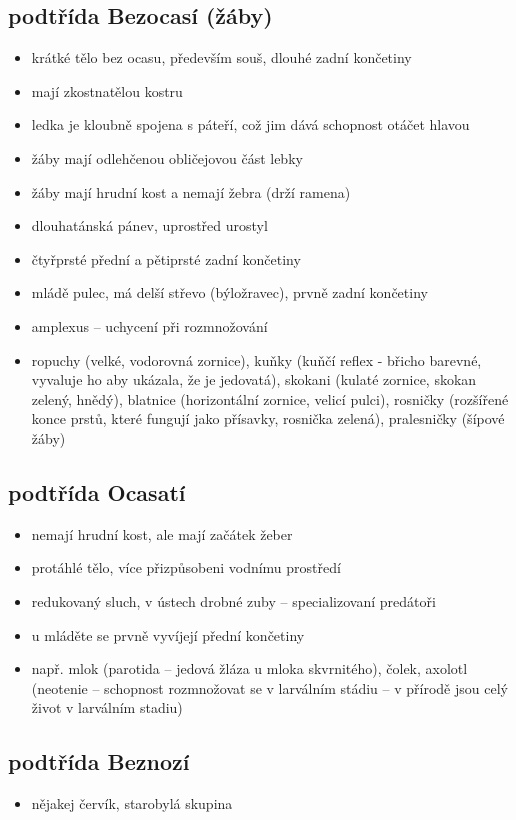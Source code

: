 \documentclass{article}
\begin{document}
\subsection{podtřída Bezocasí (žáby)}
\begin{itemize}
  \item krátké tělo bez ocasu, především souš, dlouhé zadní končetiny
  \item mají zkostnatělou kostru
  \item ledka je kloubně spojena s páteří, což jim dává schopnost otáčet hlavou
  \item žáby mají odlehčenou obličejovou část lebky
  \item žáby mají hrudní kost a nemají žebra (drží ramena)
  \item dlouhatánská pánev, uprostřed urostyl
  \item čtyřprsté přední a pětiprsté zadní končetiny
  \item mládě pulec, má delší střevo (býložravec), prvně zadní končetiny
  \item amplexus -- uchycení při rozmnožování
  \item ropuchy (velké, vodorovná zornice), kuňky (kuňčí reflex - břicho barevné, vyvaluje ho aby ukázala, že je jedovatá), skokani (kulaté zornice, skokan zelený, hnědý), blatnice (horizontální zornice, velicí pulci), rosničky (rozšířené konce prstů, které fungují jako přísavky, rosnička zelená), pralesničky (šípové žáby)
\end{itemize}

\subsection{podtřída Ocasatí}
\begin{itemize}
  \item nemají hrudní kost, ale mají začátek žeber
  \item protáhlé tělo, více přizpůsobeni vodnímu prostředí
  \item redukovaný sluch, v ústech drobné zuby -- specializovaní predátoři
  \item u mláděte se prvně vyvíjejí přední končetiny
  \item např. mlok (parotida -- jedová žláza u mloka skvrnitého), čolek, axolotl (neotenie -- schopnost rozmnožovat se v larválním stádiu -- v přírodě jsou celý život v larválním stadiu)
\end{itemize}

\subsection{podtřída Beznozí}
\begin{itemize}
  \item nějakej červík, starobylá skupina
\end{itemize}
\end{document}
